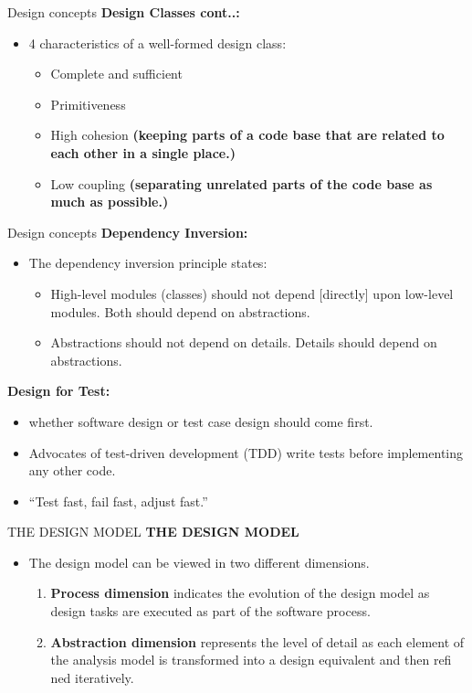 \documentclass{beamer}
\begin{document}
\begin{frame}{Design concepts}
\textbf{Design Classes cont..:}
\begin{itemize}
	\item 4 characteristics of a well-formed design class:
	\begin{itemize}
		\item  Complete and sufficient
		\item Primitiveness
		\item High cohesion \textbf{(keeping parts of a code base that are related to each other in a single place.)}
		\item Low coupling \textbf{(separating unrelated parts of the code base as much as possible.)}
		
	\end{itemize}
\end{itemize}
\end{frame}
\begin{frame}{Design concepts}
	\textbf{Dependency Inversion:}
	\begin{itemize}
		\item The dependency inversion principle states:
		\begin{itemize}
			\item  High-level modules (classes)  should not depend [directly] upon low-level modules. 
			 Both should depend  on abstractions. 
			\item Abstractions should not depend on details. 
		 Details should  depend on abstractions.
		\end{itemize}
		\end{itemize}
	\textbf{Design for Test:}
	\begin{itemize}
		\item whether software design or test case design should come first.
		\item Advocates of test-driven development (TDD) write tests before implementing any 
		other code.
		\item “Test fast, fail fast, adjust fast.”
	\end{itemize}
\end{frame}
\begin{frame}{THE DESIGN MODEL}
\textbf{THE DESIGN MODEL}
\begin{itemize}
	\item The design model can be viewed in two different dimensions.
	\begin{enumerate}
		\item \textbf{Process dimension} indicates the evolution of the design model as  design tasks are executed as part of the software process.
		\item \textbf{Abstraction dimension} represents the level of detail as each element  of the analysis model is transformed into a design equivalent and then  refi ned iteratively.
		
	\end{enumerate}
\end{itemize}
\end{frame}
\end{document}
